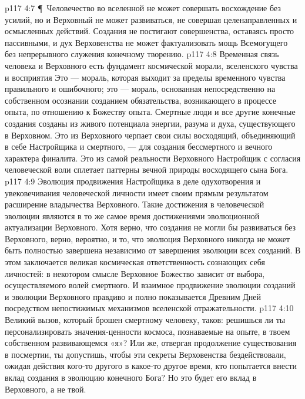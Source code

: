 \vs p117 4:7 \P\ Человечество во вселенной не может совершать восхождение без усилий, но и Верховный не может развиваться, не совершая целенаправленных и осмысленных действий. Создания не постигают совершенства, оставаясь просто пассивными, и дух Верховенства не может фактуализовать мощь Всемогущего без непрерывного служения конечному творению.
\vs p117 4:8 Временная связь человека и Верховного есть фундамент космической морали, вселенского чувства и восприятия  Это --- мораль, которая выходит за пределы временного чувства правильного и ошибочного; это --- мораль, основанная непосредственно на собственном осознании созданием обязательства, возникающего в процессе опыта, по отношению к Божеству опыта. Смертные люди и все другие конечные создания созданы из живого потенциала энергии, разума и духа, существующего в Верховном. Это из Верховного черпает свои силы восходящий, объединяющий в себе Настройщика и смертного, --- для создания бессмертного и вечного характера финалита. Это из самой реальности Верховного Настройщик с согласия человеческой воли сплетает паттерны вечной природы восходящего сына Бога.
\vs p117 4:9 Эволюция продвижения Настройщика в деле одухотворения и увековечивания человеческой личности имеет своим прямым результатом расширение владычества Верховного. Такие достижения в человеческой эволюции являются в то же самое время достижениями эволюционной актуализации Верховного. Хотя верно, что создания не могли бы развиваться без Верховного, верно, вероятно, и то, что эволюция Верховного никогда не может быть полностью завершена независимо от завершения эволюции всех созданий. В этом заключается великая космическая ответственность сознающих себя личностей: в некотором смысле Верховное Божество зависит от выбора, осуществляемого волей смертного. И взаимное продвижение эволюции созданий и эволюции Верховного правдиво и полно показывается Древним Дней посредством непостижимых механизмов вселенской отражательности.
\vs p117 4:10 Великий вызов, который брошен смертному человеку, таков: решишься ли ты персонализировать значения\hyp{}ценности космоса, познаваемые на опыте, в твоем собственном развивающемся «я»? Или же, отвергая продолжение существования в посмертии, ты допустишь, чтобы эти секреты Верховенства бездействовали, ожидая действия кого\hyp{}то другого в какое\hyp{}то другое время, кто попытается  внести вклад создания в эволюцию конечного Бога? Но это будет его вклад в Верховного, а не твой.
